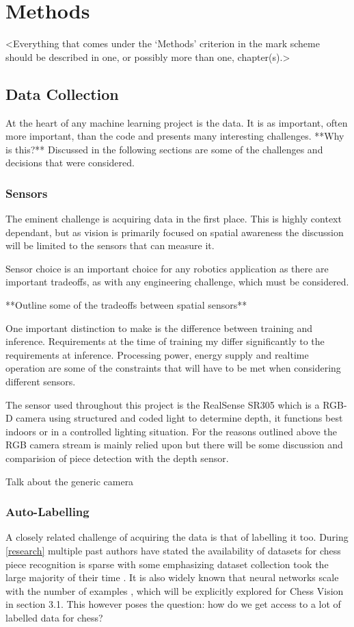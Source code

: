 \chapter{Methods}
\label{chapter2}

<Everything that comes under the `Methods' criterion in the mark scheme should be described in one, or possibly more than one, chapter(s).>

\section{Data Collection}
At the heart of any machine learning project is the data.  
It is as important, often more important, than the code and presents many interesting
challenges.  **Why is this?**
Discussed in the following sections are some of the challenges and decisions that were considered.

\subsection{Sensors}
The eminent challenge is acquiring data in the first place.  This is highly context 
dependant, but as vision is primarily focused on spatial awareness the discussion 
will be limited to the sensors that can measure it.

Sensor choice is an important choice for any robotics application as there are 
important tradeoffs, as with any engineering challenge, which must be considered.

**Outline some of the tradeoffs between spatial sensors**

One important distinction to make is the difference between training and inference.
Requirements at the time of training my differ significantly to the requirements at 
inference.  Processing power, energy supply and realtime operation are some
of the constraints that will have to be met when considering different sensors.

The sensor used throughout this project is the RealSense SR305 which is a RGB-D camera
using structured and coded light to determine depth, it functions best indoors or in a 
controlled lighting situation.  For the reasons outlined above the RGB camera stream is 
mainly relied upon but there will be some discussion and comparision of piece detection 
with the depth sensor.  

Talk about the generic camera

\subsection{Auto-Labelling}
A closely related challenge of acquiring the data is that of labelling it too. 
During \autoref{research} multiple past authors have stated the availability of 
datasets for chess piece recognition is sparse \cite{} with some emphasizing
dataset collection took the large majority of their time \cite{}.
It is also widely known that neural networks scale with the number of examples \cite{}, 
which will be explicitly explored for Chess Vision in section 3.1.
This however poses the question: how do we get access to a lot of labelled data 
for chess?

